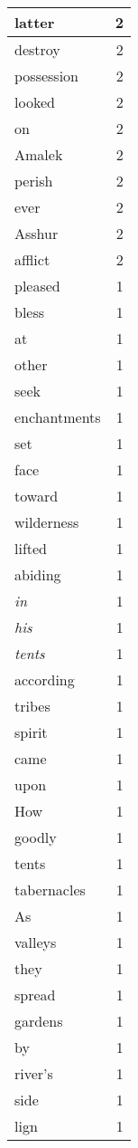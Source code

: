 \begin{center}
\begin{longtable}{l|r}
latter & 2\\ \hline 
destroy & 2\\ \hline 
possession & 2\\ \hline 
looked & 2\\ \hline 
on & 2\\ \hline 
Amalek & 2\\ \hline 
perish & 2\\ \hline 
ever & 2\\ \hline 
Asshur & 2\\ \hline 
afflict & 2\\ \hline 
pleased & 1\\ \hline 
bless & 1\\ \hline 
at & 1\\ \hline 
other & 1\\ \hline 
seek & 1\\ \hline 
enchantments & 1\\ \hline 
set & 1\\ \hline 
face & 1\\ \hline 
toward & 1\\ \hline 
wilderness & 1\\ \hline 
lifted & 1\\ \hline 
abiding & 1\\ \hline 
\emph{in} & 1\\ \hline 
\emph{his} & 1\\ \hline 
\emph{tents} & 1\\ \hline 
according & 1\\ \hline 
tribes & 1\\ \hline 
spirit & 1\\ \hline 
came & 1\\ \hline 
upon & 1\\ \hline 
How & 1\\ \hline 
goodly & 1\\ \hline 
tents & 1\\ \hline 
tabernacles & 1\\ \hline 
As & 1\\ \hline 
valleys & 1\\ \hline 
they & 1\\ \hline 
spread & 1\\ \hline 
gardens & 1\\ \hline 
by & 1\\ \hline 
river's & 1\\ \hline 
side & 1\\ \hline 
lign & 1\\ \hline 

\end{longtable}
\end{center}
